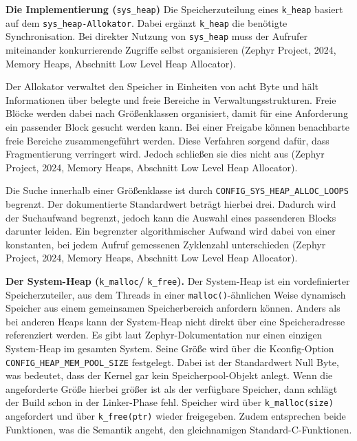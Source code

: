 \textbf{Die Implementierung (}\lstinline[style=codeinline]|sys_heap|\textbf{)} Die Speicherzuteilung eines \lstinline[style=codeinline]|k_heap| basiert auf dem \lstinline[style=codeinline]|sys_heap-Allokator|. Dabei erg{\"a}nzt \lstinline[style=codeinline]|k_heap| die ben{\"o}tigte Synchronisation. Bei direkter Nutzung von \lstinline[style=codeinline]|sys_heap| muss der Aufrufer miteinander konkurrierende Zugriffe selbst organisieren (Zephyr Project, 2024, \glqq{}Memory Heaps\grqq{}, Abschnitt \glqq{}Low Level Heap Allocator\grqq{}).

Der Allokator verwaltet den Speicher in Einheiten von acht Byte und h{\"a}lt Informationen {\"u}ber belegte und freie Bereiche in Verwaltungsstrukturen. Freie Bl{\"o}cke werden dabei nach Gr{\"o}{\ss}enklassen organisiert, damit f{\"u}r eine Anforderung ein passender Block gesucht werden kann. Bei einer Freigabe k{\"o}nnen benachbarte freie Bereiche zusammengef{\"u}hrt werden. Diese Verfahren sorgend daf{\"u}r, dass Fragmentierung verringert wird. Jedoch schlie{\ss}en sie dies nicht aus (Zephyr Project, 2024, \glqq{}Memory Heaps\grqq{}, Abschnitt \glqq{}Low Level Heap Allocator\grqq{}).

Die Suche innerhalb einer Gr{\"o}{\ss}enklasse ist durch \lstinline[style=codeinline]|CONFIG_SYS_HEAP_ALLOC_LOOPS| begrenzt. Der dokumentierte Standardwert betr{\"a}gt hierbei drei. Dadurch wird der Suchaufwand begrenzt, jedoch kann die Auswahl eines passenderen Blocks darunter leiden. Ein begrenzter algorithmischer Aufwand wird dabei von einer konstanten, bei jedem Aufruf gemessenen Zyklenzahl unterschieden (Zephyr Project, 2024, \glqq{}Memory Heaps\grqq{}, Abschnitt \glqq{}Low Level Heap Allocator\grqq{}).

\textbf{Der System-Heap (}\lstinline[style=codeinline]|k_malloc|\textbf{/ }\lstinline[style=codeinline]|k_free|\textbf{).} Der System-Heap ist ein vordefinierter Speicherzuteiler, aus dem Threads in einer \lstinline[style=codeinline]|malloc()|-{\"a}hnlichen Weise dynamisch Speicher aus einem gemeinsamen Speicherbereich anfordern k{\"o}nnen. Anders als bei anderen Heaps kann der System-Heap nicht direkt {\"u}ber eine Speicheradresse referenziert werden. Es gibt laut Zephyr-Dokumentation nur einen einzigen System-Heap im gesamten System. Seine Gr{\"o}{\ss}e wird {\"u}ber die Kconfig-Option \lstinline[style=codeinline]|CONFIG_HEAP_MEM_POOL_SIZE| festgelegt. Dabei ist der Standardwert Null Byte, was bedeutet, dass der Kernel gar kein Speicherpool-Objekt anlegt. Wenn die angeforderte Gr{\"o}{\ss}e hierbei gr{\"o}{\ss}er ist als der verf{\"u}gbare Speicher, dann schl{\"a}gt der Build schon in der Linker-Phase fehl. Speicher wird {\"u}ber \lstinline[style=codeinline]|k_malloc(size)| angefordert und {\"u}ber \lstinline[style=codeinline]|k_free(ptr)| wieder freigegeben. Zudem entsprechen beide Funktionen, was die Semantik angeht, den gleichnamigen Standard-C-Funktionen.

